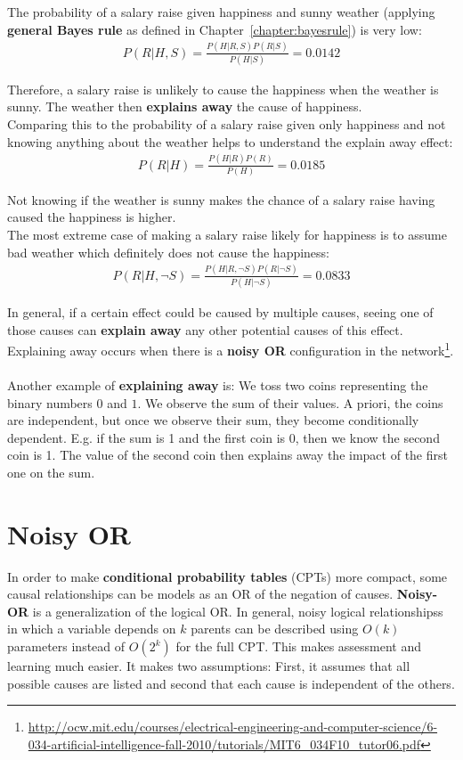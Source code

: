 \documentclass{report}
\begin{document}
The probability of a salary raise given happiness and sunny weather (applying {\bf general Bayes rule} as defined in Chapter~\ref{chapter:bayesrule}) is very low:
\begin{align*}
P(R\vert H,S) = \frac{P(H\vert R, S)P(R\vert S)}{P(H\vert S)} = 0.0142
\end{align*}

Therefore, a salary raise is unlikely to cause the happiness when the weather is sunny. The weather then {\bf explains away} the cause of happiness.
\\
Comparing this to the probability of a salary raise given only happiness and not knowing anything about the weather helps to understand the explain away effect:
\begin{align*}
P(R\vert H) = \frac{P(H\vert R)P(R)}{P(H)} = 0.0185
\end{align*}

Not knowing if the weather is sunny makes the chance of a salary raise having caused the happiness is higher.
\\
The most extreme case of making a salary raise likely for happiness is to assume bad weather which definitely does not cause the happiness:
\begin{align*}
P(R\vert H,\neg S) = \frac{P(H\vert R, \neg S)P(R\vert \neg S)}{P(H\vert \neg S)} = 0.0833
\end{align*}

In general, if a certain effect could be caused by multiple causes, seeing one of those causes can {\bf explain away} any other potential causes of this effect.
Explaining away occurs when there is a {\bf noisy OR} configuration in the network\footnote{\url{http://ocw.mit.edu/courses/electrical-engineering-and-computer-science/6-034-artificial-intelligence-fall-2010/tutorials/MIT6_034F10_tutor06.pdf}}.
\\
\\
Another example of {\bf explaining away} is: We toss two coins representing the binary numbers $0$ and $1$.
We observe the sum of their values.
A priori, the coins are independent, but once we observe their sum, they become conditionally dependent.
E.g. if the sum is 1 and the first coin is 0, then we know the second coin is 1.
The value of the second coin then explains away the impact of the first one on the sum.


\section{Noisy OR}
In order to make {\bf conditional probability tables} (CPTs) more compact, some causal relationships can be models as an OR of the negation of causes. {\bf Noisy-OR} is a generalization of the logical OR.
In general, noisy logical relationshipss in which a variable depends on $k$ parents can be described using $O(k)$ parameters instead of $O(2^k)$ for the full CPT.
This makes assessment and learning much easier.
It makes two assumptions: First, it assumes that all possible causes are listed and second that each cause is independent of the others.
\end{document}
